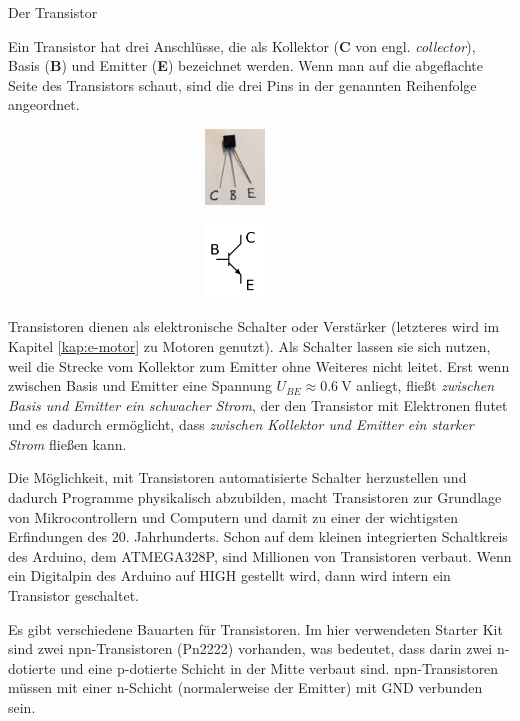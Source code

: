\begin{zsfg}{Der Transistor}
	
	\medskip
	\begin{minipage}{0.7\textwidth}
		Ein Transistor hat drei Anschlüsse, die als Kollektor (\textbf{C} von engl. \emph{collector}), Basis (\textbf{B}) und Emitter (\textbf{E}) bezeichnet werden. Wenn man auf die abgeflachte Seite des Transistors schaut, sind die drei Pins in der genannten Reihenfolge angeordnet.
	\end{minipage}
	\hfill
	\begin{minipage}{0.28\textwidth}
		\begin{minipage}{0.48\textwidth}
			\centering
			\includegraphics[width=0.9\textwidth, height=2cm]{./pics/transistor.jpg}
		\end{minipage}
		\hfill
		\begin{minipage}{0.48\textwidth}
			\centering
			\includegraphics[width=0.9\textwidth, height=2cm]{./pics/transistor-schaltsymbol.png}
		\end{minipage}
	\end{minipage}
	
	\medskip
	Transistoren dienen als elektronische Schalter oder Verstärker (letzteres wird im Kapitel \ref{kap:e-motor} zu Motoren genutzt). Als Schalter lassen sie sich nutzen, weil die Strecke vom Kollektor zum Emitter ohne Weiteres nicht leitet. Erst wenn zwischen Basis und Emitter eine Spannung $U_{BE} \approx \SI{0,6}{\volt}$ anliegt, fließt \emph{zwischen Basis und Emitter ein schwacher Strom}, der den Transistor mit Elektronen flutet und es dadurch ermöglicht, dass \emph{zwischen Kollektor und Emitter ein starker Strom} fließen kann.
	
	Die Möglichkeit, mit Transistoren automatisierte Schalter herzustellen und dadurch Programme physikalisch abzubilden, macht Transistoren zur Grundlage von Mikrocontrollern und Computern und damit zu einer der wichtigsten Erfindungen des 20. Jahrhunderts. Schon auf dem kleinen integrierten Schaltkreis des Arduino, dem ATMEGA328P, sind Millionen von Transistoren verbaut. Wenn ein Digitalpin des Arduino auf HIGH gestellt wird, dann wird intern ein Transistor geschaltet.
	
	Es gibt verschiedene Bauarten für Transistoren. Im hier verwendeten Starter Kit sind zwei npn-Transistoren (Pn2222) vorhanden, was bedeutet, dass darin zwei n-dotierte und eine p-dotierte Schicht in der Mitte verbaut sind. npn-Transistoren müssen mit einer n-Schicht (normalerweise der Emitter) mit GND verbunden sein.
\end{zsfg}


